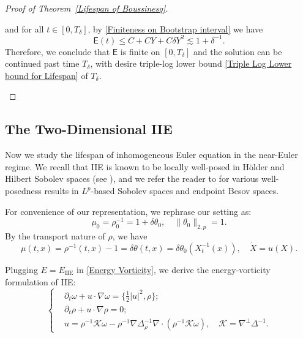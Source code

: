 \documentclass[12pt,letterpaper]{article}
\theoremstyle{plain}
\begin{document}
\begin{proof}[Proof of Theorem~\ref{Lifespan of Boussinesq}]
\begin{itemize}
 and for all $t\in [0,T_\delta]$, by \eqref{Finiteness on Bootstrap interval} we have
\begin{equation*}
\mathsf E(t)\le  C+CY+C\delta Y^2\lesssim 1+\delta^{-1}.
\end{equation*}
  Therefore, we conclude that $\mathsf E$ is finite on $[0,T_\delta]$ and the solution can be continued past time $T_\delta$, with desire triple-log lower bound \eqref{Triple Log Lower bound for Lifespan} of $T_\delta$.
\end{itemize}

\end{proof}



\subsection{The Two-Dimensional IIE}
Now we study the lifespan of inhomogeneous Euler equation in the near-Euler regime. We recall that IIE is known to be locally well-posed in H\"older and Hilbert Sobolev spaces (see \cite{BeiraoDaVeigaValli1978}\cite{BeiraoDaVeigaValli1980I}\cite{BeiraoDaVeigaValli1980II}\cite{VALLI198843}), and we refer the reader to \cite{Da06}\cite{[Da10]}\cite{[DF11]} for various well-posedness results in $L^p$-based Sobolev spaces and endpoint Besov spaces.

For convenience of our representation, we rephrase our setting as:
\begin{equation*}
 \mu_0=\rho_0^{-1}=1+\delta\theta_0,\quad \lVert\theta_0\rVert_{2,p}=1.   
\end{equation*}
By the transport nature of $\rho$, we have
\begin{equation*}
 \mu(t,x)=\rho^{-1}(t,x)-1=\delta\theta(t,x)=\delta\theta_0(X_t^{-1}(x)),\quad \dot X=u(X).   
\end{equation*}

Plugging $E=E_{\text{IIE}}$ in \eqref{Energy Vorticity}, we derive the energy-vorticity formulation of IIE:
\begin{equation}\label{IIE vorticity}
\left\{
\begin{aligned}
&\partial_t \omega+u\cdot\nabla \omega=\{\frac{1}{2}\lvert u\rvert^2,\rho\};\\
&\partial_t \rho+u\cdot\nabla\rho=0;\\
& u=\rho^{-1}\mathcal K\omega-\rho^{-1}\nabla\Delta_{\rho}^{-1}\nabla\cdot(\rho^{-1}\mathcal K\omega),\quad \mathcal K=\nabla^\perp\Delta^{-1}.
\end{aligned}
\right.
\end{equation}
\end{document}
